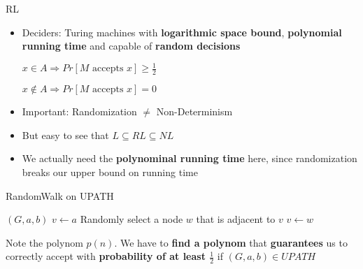 \begin{frame}{RL}

\begin{itemize}
\item
  Deciders: Turing machines with \textbf{logarithmic space bound},
  \textbf{polynomial running time} and capable of \textbf{random
  decisions}

  $x \in A \Rightarrow Pr[M \text{ accepts } x] \geq \frac{1}{2}$

  $x \not \in A \Rightarrow Pr[M \text{ accepts } x] = 0$
\item
  Important: Randomization $\not =$ Non-Determinism
\item
  But easy to see that $L \subseteq RL \subseteq NL$
\item
  We actually need the \textbf{polynominal running time} here, since
  randomization breaks our upper bound on running time
\end{itemize}

\end{frame}

\begin{frame}{RandomWalk on UPATH}

\renewcommand{\algorithmicrequire}{\textbf{Input:}}
\renewcommand{\algorithmicensure}{\textbf{Output:}}

\begin{algorithmic}
\Require $(G, a, b)$
\State $v \gets a$
    \State Randomly select a node $w$ that is adjacent to $v$
    \State $v \gets w$
    \EndIf
\EndFor
{}
\end{algorithmic}

Note the polynom $p(n)$. We have to \textbf{find a polynom} that
\textbf{guarantees} us to correctly accept with \textbf{probability of
at least $\frac{1}{2}$} if $(G, a, b) \in UPATH$

\end{frame}

